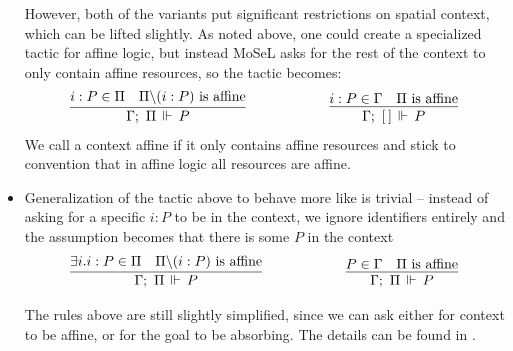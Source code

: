 \begin{itemize}
  However, both of the variants put significant restrictions on spatial context, which can be lifted slightly.
  As noted above, one could create a specialized tactic for affine logic, but instead MoSeL asks for the rest of the context to only contain affine resources, so the tactic becomes:
  \begin{align*}
      \infer%
        {\entailsD P}
        {i : P \in \SpatD &
         \SpatD \backslash (i : P) \text{ is affine}}
    & \hspace{5em}
    & \infer%
        {\entails {\IntuD} {[\,]} P}
        {i : P \in \IntuD &
         \SpatD \text{ is affine}}
  \end{align*}
  We call a context affine if it only contains affine resources and stick to convention that in affine logic all resources are affine.
\item Generalization of the tactic above to behave more like  is trivial -- instead of asking for a specific \(i : P\) to be in the context, we ignore identifiers entirely and the assumption becomes that there is some \(P\) in the context
  \begin{align*}
      \infer%
        {\entailsD P}
        {\exists i. i : P \in \SpatD &
         \SpatD \backslash (i : P) \text{ is affine}}
    & \hspace{5em}
    & \infer%
        {\entailsD P}
        {P \in \IntuD &
         \SpatD \text{ is affine}}
  \end{align*}

  The rules above are still slightly simplified, since we can ask either for context to be affine, or for the goal to be absorbing.
  The details can be found in \citet[Section 2.3]{krebbersMoSeLGeneralExtensible2018}.
\end{itemize}

